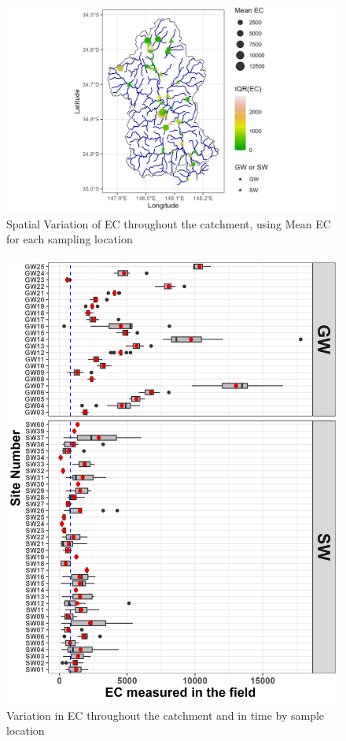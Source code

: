 \documentclass[, manuscript]{copernicus}
\begin{document}
\begin{figure}
\includegraphics[width=0.8\linewidth]{Figures/ec_map} \caption{Spatial Variation of EC throughout the catchment, using Mean EC for each sampling location}\label{fig:ECmap}
\end{figure}

\begin{figure}
\includegraphics[width=0.8\linewidth]{Figures/ec_plot} \caption{Variation in EC throughout the catchment and in time by sample location}\label{fig:ECboxplot}
\end{figure}
\end{document}
